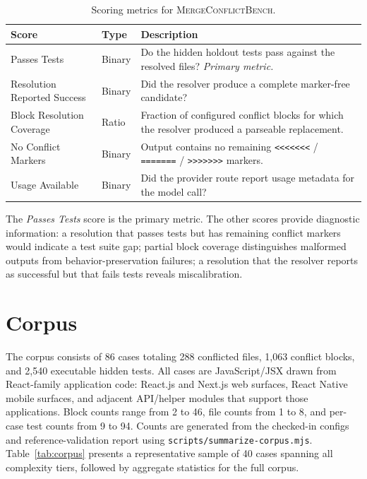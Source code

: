 \documentclass[11pt,letterpaper]{article}
\begin{document}
\begin{table}[ht]
\centering
\caption{Scoring metrics for \textsc{MergeConflictBench}.}
\label{tab:scores}
\small
\begin{tabularx}{\textwidth}{llX}
\toprule
\textbf{Score} & \textbf{Type} & \textbf{Description} \\
\midrule
Passes Tests & Binary & Do the hidden holdout tests pass against the resolved files? \emph{Primary metric.} \\
Resolution Reported Success & Binary & Did the resolver produce a complete marker-free candidate? \\
Block Resolution Coverage & Ratio & Fraction of configured conflict blocks for which the resolver produced a parseable replacement. \\
No Conflict Markers & Binary & Output contains no remaining \texttt{<{}<{}<{}<{}<{}<{}<} / \texttt{=======} / \texttt{>{}>{}>{}>{}>{}>{}>{}} markers. \\
Usage Available & Binary & Did the provider route report usage metadata for the model call? \\
\bottomrule
\end{tabularx}
\end{table}

The \emph{Passes Tests} score is the primary metric. The other scores provide diagnostic information: a resolution that passes tests but has remaining conflict markers would indicate a test suite gap; partial block coverage distinguishes malformed outputs from behavior-preservation failures; a resolution that the resolver reports as successful but that fails tests reveals miscalibration.

\section{Corpus}
\label{sec:corpus}

The corpus consists of 86 cases totaling 288 conflicted files, 1{,}063 conflict blocks, and 2{,}540 executable hidden tests. All cases are JavaScript/JSX drawn from React-family application code: React.js and Next.js web surfaces, React Native mobile surfaces, and adjacent API/helper modules that support those applications. Block counts range from 2 to 46, file counts from 1 to 8, and per-case test counts from 9 to 94. Counts are generated from the checked-in configs and reference-validation report using \texttt{scripts/summarize-corpus.mjs}. Table~\ref{tab:corpus} presents a representative sample of 40 cases spanning all complexity tiers, followed by aggregate statistics for the full corpus.
\end{document}
